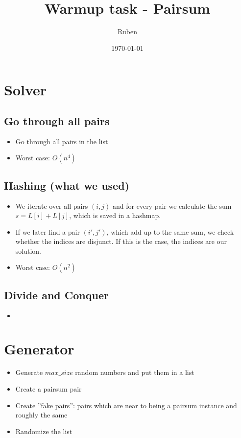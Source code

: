 \documentclass[11pt]{article}
\title{Warmup task - Pairsum}
\author{ Ruben }
\date{\today}
\begin{document}
\maketitle	

\section*{Solver}
\subsection*{Go through all pairs}
\begin{itemize}
    \item Go through all pairs in the list
    \item Worst case: $O(n^4)$
\end{itemize}
\subsection*{Hashing (what we used)}
\begin{itemize}
    \item We iterate over all pairs $(i,j)$ and for every pair we calculate the sum $s = L[i]+L[j]$, which is saved in a hashmap.
    \item If we later find a pair $(i',j')$, which add up to the same sum, we check whether the indices are disjunct. If this is the case, the indices are our solution.
    \item Worst case: $O(n^2)$
\end{itemize}
\subsection*{Divide and Conquer}
\begin{itemize}
    \item 
\end{itemize}
\section*{Generator}
\begin{itemize}
    \item Generate $max\_size$ random numbers and put them in a list
    \item Create a pairsum pair
    \item Create ''fake pairs'': pairs which are near to being a pairsum instance and roughly the same
    \item Randomize the list
\end{itemize}
\end{document}

